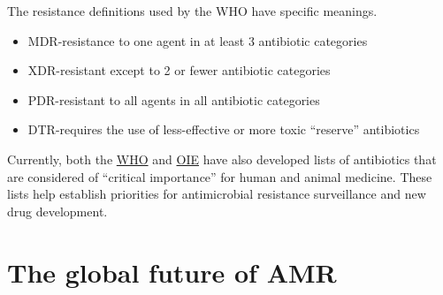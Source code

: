 \documentclass[
  letterpaper,
  DIV=11,
  numbers=noendperiod]{scrreprt}
\providecommand{\tightlist}{%
  \setlength{\itemsep}{0pt}\setlength{\parskip}{0pt}}\usepackage{longtable,booktabs,array}
\begin{document}
\begin{tcolorbox}[enhanced jigsaw, toptitle=1mm, colframe=quarto-callout-note-color-frame, arc=.35mm, rightrule=.15mm, title=\textcolor{quarto-callout-note-color}{\faInfo}\hspace{0.5em}{What do these resistance definitions mean?}, leftrule=.75mm, opacityback=0, opacitybacktitle=0.6, breakable, coltitle=black, toprule=.15mm, colback=white, colbacktitle=quarto-callout-note-color!10!white, bottomtitle=1mm, titlerule=0mm, bottomrule=.15mm, left=2mm]

The resistance definitions used by the WHO have specific meanings.

\begin{itemize}
\tightlist
\item
  MDR-resistance to one agent in at least 3 antibiotic categories
\item
  XDR-resistant except to 2 or fewer antibiotic categories
\item
  PDR-resistant to all agents in all antibiotic categories
\item
  DTR-requires the use of less-effective or more toxic ``reserve''
  antibiotics
\end{itemize}

\end{tcolorbox}

Currently, both the
\href{https://apps.who.int/iris/bitstream/handle/10665/312266/9789241515528-eng.pdf}{WHO}
and
\href{https://www.oie.int/en/what-we-do/global-initiatives/antimicrobial-resistance/\#ui-id-4}{OIE}
have also developed lists of antibiotics that are considered of
``critical importance'' for human and animal medicine. These lists help
establish priorities for antimicrobial resistance surveillance and new
drug development.

\hypertarget{the-global-future-of-amr}{%
\section*{The global future of AMR}\label{the-global-future-of-amr}}

\end{document}
